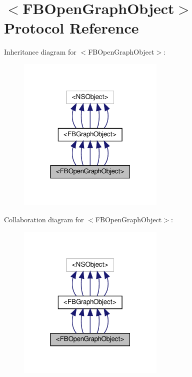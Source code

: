 \hypertarget{protocolFBOpenGraphObject-p}{}\section{$<$F\+B\+Open\+Graph\+Object$>$ Protocol Reference}
\label{protocolFBOpenGraphObject-p}


Inheritance diagram for $<$F\+B\+Open\+Graph\+Object$>$\+:
\nopagebreak
\begin{figure}[H]
\begin{center}
\leavevmode
\includegraphics[width=199pt]{protocolFBOpenGraphObject-p__inherit__graph}
\end{center}
\end{figure}


Collaboration diagram for $<$F\+B\+Open\+Graph\+Object$>$\+:
\nopagebreak
\begin{figure}[H]
\begin{center}
\leavevmode
\includegraphics[width=199pt]{protocolFBOpenGraphObject-p__coll__graph}
\end{center}
\end{figure}
